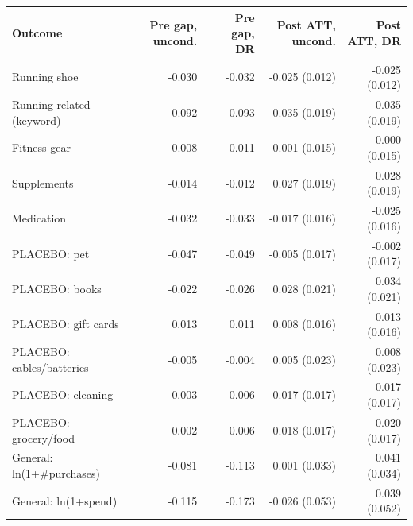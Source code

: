 \begin{tabular}{lrrrr}
\toprule
Outcome & Pre gap, uncond. & Pre gap, DR & Post ATT, uncond. & Post ATT, DR \\
\midrule
Running shoe & -0.030 & -0.032 & -0.025 (0.012) & -0.025 (0.012) \\
Running-related (keyword) & -0.092 & -0.093 & -0.035 (0.019) & -0.035 (0.019) \\
Fitness gear & -0.008 & -0.011 & -0.001 (0.015) & 0.000 (0.015) \\
Supplements & -0.014 & -0.012 & 0.027 (0.019) & 0.028 (0.019) \\
Medication & -0.032 & -0.033 & -0.017 (0.016) & -0.025 (0.016) \\
PLACEBO: pet & -0.047 & -0.049 & -0.005 (0.017) & -0.002 (0.017) \\
PLACEBO: books & -0.022 & -0.026 & 0.028 (0.021) & 0.034 (0.021) \\
PLACEBO: gift cards & 0.013 & 0.011 & 0.008 (0.016) & 0.013 (0.016) \\
PLACEBO: cables/batteries & -0.005 & -0.004 & 0.005 (0.023) & 0.008 (0.023) \\
PLACEBO: cleaning & 0.003 & 0.006 & 0.017 (0.017) & 0.017 (0.017) \\
PLACEBO: grocery/food & 0.002 & 0.006 & 0.018 (0.017) & 0.020 (0.017) \\
General: ln(1+\#purchases) & -0.081 & -0.113 & 0.001 (0.033) & 0.041 (0.034) \\
General: ln(1+spend) & -0.115 & -0.173 & -0.026 (0.053) & 0.039 (0.052) \\
\bottomrule
\end{tabular}
